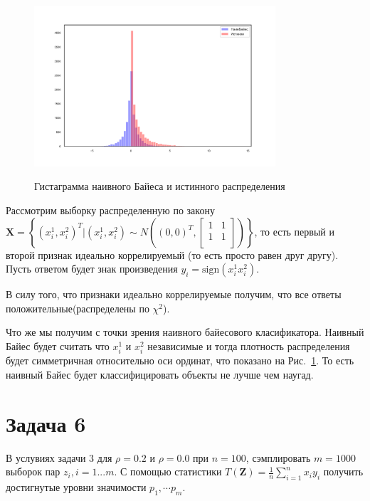 \documentclass[12pt, twoside]{article}
\begin{document}
\begin{figure}[h!]\center
{\includegraphics[width=0.8\textwidth]{sampler_task5}}
\caption{Гистаграмма наивного Байеса и истинного распределения}
\label{sampler_task5}
\end{figure}

Рассмотрим выборку распределенную по закону $\textbf{X} = \left\{(x^1_i, x^2_i)^T| (x^1_i, x^2_i) \sim N\left((0, 0)^T, \begin{bmatrix}
1 & 1\\
1 & 1\\
\end{bmatrix}\right)\right\}$, то есть первый и второй признак идеально коррелируемый (то есть просто равен друг другу). Пусть ответом будет знак произведения $y_i = \text{sign}(x^1_ix^2_i)$. 

В силу того, что признаки идеально коррелируемые получим, что все ответы положительные(распределены по $\chi^2$). 

Что же мы получим с точки зрения наивного байесового класификатора. Наивный Байес будет считать что $x^1_i$ и $x^2_i$ независимые и тогда плотность распределения будет симметричная относительно оси ординат, что показано на Рис.~\ref{sampler_task5}. То есть наивный Байес будет классифицировать объекты не лучше чем наугад.

\section{Задача 6}

В услувиях задачи 3 для $\rho = 0.2$ и $\rho=0.0$ при $n=100$, сэмплировать $m = 1000$ выборок пар $z_i, i=1...m$. С помощью статистики $T(\textbf{Z}) = \frac{1}{n}\sum_{i=1}^{n}x_iy_i$ получить достигнутые уровни значимости $p_1, \cdots p_m$. 
\end{document}
